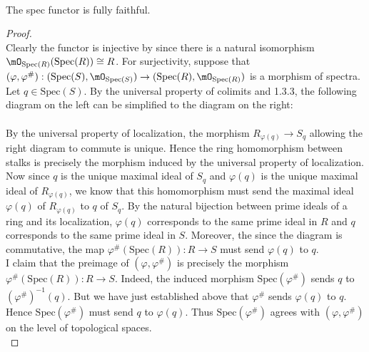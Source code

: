 \documentclass[a4paper]{article}
\begin{document}
\begin{prp}{}{}\\
The spec functor is fully faithful. 
\begin{proof}\\
Clearly the functor is injective by since there is a natural isomorphism $\mO_{\text{Spec}(R)}(\text{Spec}(R))\cong R$. For surjectivity, suppose that $(\varphi,\varphi^\#):(\text{Spec}(S),\mO_{\text{Spec}(S)})\to(\text{Spec}(R),\mO_{\text{Spec}(R)})$ is a morphism of spectra. Let $q\in\text{Spec}(S)$. By the universal property of colimits and 1.3.3, the following diagram on the left can be simplified to the diagram on the right: \\
 \\
By the universal property of localization, the morphism $R_{\varphi(q)}\to S_q$ allowing the right diagram to commute is unique. Hence the ring homomorphism between stalks is precisely the morphism induced by the universal property of localization. Now since $q$ is the unique maximal ideal of $S_q$ and $\varphi(q)$ is the unique maximal ideal of $R_{\varphi(q)}$, we know that this homomorphism must send the maximal ideal $\varphi(q)$ of $R_{\varphi(q)}$ to $q$ of $S_q$. By the natural bijection between prime ideals of a ring and its localization, $\varphi(q)$ corresponds to the same prime ideal in $R$ and $q$ corresponds to the same prime ideal in $S$. Moreover, the since the diagram is commutative, the map $\varphi^\#(\text{Spec}(R)):R\to S$ must send $\varphi(q)$ to $q$. \\

I claim that the preimage of $(\varphi,\varphi^\#)$ is precisely the morphism $\varphi^\#(\text{Spec}(R)):R\to S$. Indeed, the induced morphism $\text{Spec}(\varphi^\#)$ sends $q$ to $(\varphi^\#)^{-1}(q)$. But we have just established above that $\varphi^\#$ sends $\varphi(q)$ to $q$. Hence $\text{Spec}(\varphi^\#)$ must send $q$ to $\varphi(q)$. Thus $\text{Spec}(\varphi^\#)$ agrees with $(\varphi,\varphi^\#)$ on the level of topological spaces. \\


\end{proof}
\end{prp}
\end{document}

